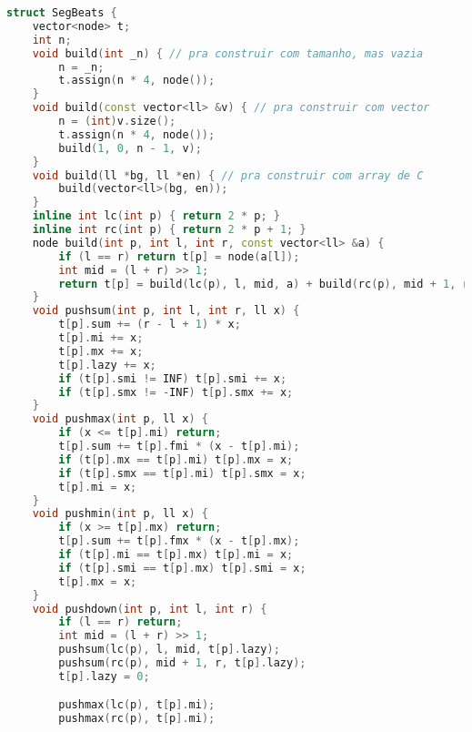\documentclass[10pt, a4paper, oneside]{book}
\begin{document}
\begin{lstlisting}[language=C++]
struct SegBeats {
    vector<node> t;
    int n;
    void build(int _n) { // pra construir com tamanho, mas vazia
        n = _n;
        t.assign(n * 4, node());
    }
    void build(const vector<ll> &v) { // pra construir com vector
        n = (int)v.size();
        t.assign(n * 4, node());
        build(1, 0, n - 1, v);
    }
    void build(ll *bg, ll *en) { // pra construir com array de C
        build(vector<ll>(bg, en));
    }
    inline int lc(int p) { return 2 * p; }
    inline int rc(int p) { return 2 * p + 1; }
    node build(int p, int l, int r, const vector<ll> &a) {
        if (l == r) return t[p] = node(a[l]);
        int mid = (l + r) >> 1;
        return t[p] = build(lc(p), l, mid, a) + build(rc(p), mid + 1, r, a);
    }
    void pushsum(int p, int l, int r, ll x) {
        t[p].sum += (r - l + 1) * x;
        t[p].mi += x;
        t[p].mx += x;
        t[p].lazy += x;
        if (t[p].smi != INF) t[p].smi += x;
        if (t[p].smx != -INF) t[p].smx += x;
    }
    void pushmax(int p, ll x) {
        if (x <= t[p].mi) return;
        t[p].sum += t[p].fmi * (x - t[p].mi);
        if (t[p].mx == t[p].mi) t[p].mx = x;
        if (t[p].smx == t[p].mi) t[p].smx = x;
        t[p].mi = x;
    }
    void pushmin(int p, ll x) {
        if (x >= t[p].mx) return;
        t[p].sum += t[p].fmx * (x - t[p].mx);
        if (t[p].mi == t[p].mx) t[p].mi = x;
        if (t[p].smi == t[p].mx) t[p].smi = x;
        t[p].mx = x;
    }
    void pushdown(int p, int l, int r) {
        if (l == r) return;
        int mid = (l + r) >> 1;
        pushsum(lc(p), l, mid, t[p].lazy);
        pushsum(rc(p), mid + 1, r, t[p].lazy);
        t[p].lazy = 0;

        pushmax(lc(p), t[p].mi);
        pushmax(rc(p), t[p].mi);


\end{lstlisting}
\end{document}
